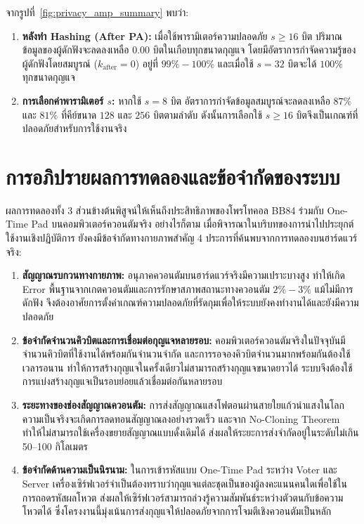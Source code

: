 จากรูปที่~\ref{fig:privacy_amp_summary} พบว่า:
\begin{enumerate}
    \item \textbf{หลังทำ Hashing (After PA):} เมื่อใช้พารามิเตอร์ความปลอดภัย $s \ge 16$ บิต ปริมาณข้อมูลของผู้ดักฟังจะลดลงเหลือ $0.00$ บิตในเกือบทุกขนาดกุญแจ โดยมีอัตราการกำจัดความรู้ของผู้ดักฟังโดยสมบูรณ์ ($k_{\text{after}} = 0$) อยู่ที่ $99\% - 100\%$ และเมื่อใช้ $s = 32$ บิตจะได้ $100\%$ ทุกขนาดกุญแจ
    \item \textbf{การเลือกค่าพารามิเตอร์ $s$:} หากใช้ $s = 8$ บิต อัตราการกำจัดข้อมูลสมบูรณ์จะลดลงเหลือ $87\%$ และ $81\%$ ที่คีย์ขนาด $128$ และ $256$ บิตตามลำดับ ดังนั้นการเลือกใช้ $s \ge 16$ บิตจึงเป็นเกณฑ์ที่ปลอดภัยสำหรับการใช้งานจริง
\end{enumerate}

\clearpage
\section{การอภิปรายผลการทดลองและข้อจำกัดของระบบ}

ผลการทดลองทั้ง 3 ส่วนข้างต้นพิสูจน์ให้เห็นถึงประสิทธิภาพของโพรโทคอล BB84 ร่วมกับ One-Time Pad บนคอมพิวเตอร์ควอนตัมจริง อย่างไรก็ตาม เมื่อพิจารณาในบริบทของการนำไปประยุกต์ใช้งานเชิงปฏิบัติการ ยังคงมีข้อจำกัดทางกายภาพสำคัญ 4 ประการที่ค้นพบจากการทดลองบนฮาร์ดแวร์จริง:

\begin{enumerate}
    \item \textbf{สัญญาณรบกวนทางกายภาพ:} อนุภาคควอนตัมบนฮาร์ดแวร์จริงมีความเปราะบางสูง ทำให้เกิด Error พื้นฐานจากเกตควอนตัมและการรักษาสภาพสถานะทางควอนตัม $2\% - 3\%$ แม้ไม่มีการดักฟัง จึงต้องอาศัยการตั้งค่าเกณฑ์ความปลอดภัยที่รัดกุมเพื่อให้ระบบยังคงทำงานได้และยังมีความปลอดภัย
    \item \textbf{ข้อจำกัดจำนวนคิวบิตและการเชื่อมต่อกุญแจหลายรอบ:} คอมพิวเตอร์ควอนตัมจริงในปัจจุบันมีจำนวนคิวบิตที่ใช้งานได้พร้อมกันจำนวนจำกัด และการรอจองคิวบิตจำนวนมากพร้อมกันต้องใช้เวลารอนาน ทำให้การสร้างกุญแจในครั้งเดียวไม่สามารถสร้างกุญแจขนาดยาวได้ ระบบจึงต้องใช้การแบ่งสร้างกุญแจเป็นรอบย่อยแล้วเชื่อมต่อกันหลายรอบ
    \item \textbf{ระยะทางของช่องสัญญาณควอนตัม:} การส่งสัญญาณแสงโฟตอนผ่านสายใยแก้วนำแสงในโลกความเป็นจริงจะเกิดการลดทอนสัญญาณลงอย่างรวดเร็ว และจาก No-Cloning Theorem ทำให้ไม่สามารถใช้เครื่องขยายสัญญาณแบบดั้งเดิมได้ ส่งผลให้ระยะการส่งจำกัดอยู่ในระดับไม่เกิน 50--100 กิโลเมตร
    \item \textbf{ข้อจำกัดด้านความเป็นนิรนาม:} ในการเข้ารหัสแบบ One-Time Pad ระหว่าง Voter และ Server เครื่องเซิร์ฟเวอร์จำเป็นต้องทราบว่ากุญแจแต่ละชุดเป็นของผู้ลงคะแนนคนใดเพื่อใช้ในการถอดรหัสผลโหวต ส่งผลให้เซิร์ฟเวอร์สามารถล่วงรู้ความสัมพันธ์ระหว่างตัวตนกับข้อความโหวตได้ ซึ่งโครงงานนี้มุ่งเน้นการส่งกุญแจให้ปลอดภัยจากการโจมตีเชิงควอนตัมเป็นหลัก
\end{enumerate}

